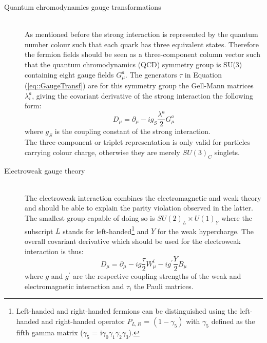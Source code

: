 \begin{myindentpar}
  \begin{description}
    \item[Quantum chromodynamics gauge transformations] \hfill \\
    As mentioned before the strong interaction is represented by the quantum number colour such that each quark has three equivalent states. Therefore the fermion fields should be seen as a three-component column vector such that the quantum chromodynamics (QCD) symmetry group is SU(3) containing eight gauge fields $G_{\mu}^{a}$. 
    The generators $\tau$ in Equation (\ref{eq::GaugeTransf}) are for this symmetry group the Gell-Mann matrices $\lambda_{i}^{a}$, giving the covariant derivative of the strong interaction the following form:
    \begin{equation}
      D_{\mu} = \partial_{\mu} - i g_{S} \frac{\lambda^{a}}{2} G_{\mu}^a
    \end{equation}
    where $g_{S}$ is the coupling constant of the strong interaction. \\
    The three-component or triplet representation is only valid for particles carrying colour charge, otherwise they are merely $SU(3)_{C}$ singlets. 
    
    \item[Electroweak gauge theory] \hfill \\
    The electroweak interaction combines the electromagnetic and weak theory and should be able to explain the parity violation observed in the latter. The smallest group capable of doing so is $SU(2)_{L} \times U(1)_{Y}$ where the subscript $L$ stands for left-handed\footnote{
      Left-handed and right-handed fermions can be distinguished using the left-handed and right-handed operator $P_{L,R}$ = $(1 - \gamma_{5})$ with $\gamma_5$ defined as the fifth gamma matrix ($\gamma_5$ = i$\gamma_0 \gamma_1 \gamma_2 \gamma_3$). 
    }
    and $Y$ for the weak hypercharge.
    The overall covariant derivative which should be used for the electroweak interaction is thus:
    \begin{equation}
     D_{\mu} = \partial_{\mu} - i g \frac{\tau}{2} W_{\mu}^{i} - i g^{'} \frac{Y}{2} B_{\mu}
    \end{equation}
    where $g$ and $g^{'}$ are the respective coupling strengths of the weak and electromagnetic interaction and $\tau_{i}$ the Pauli matrices. 
    

\end{description}
\end{myindentpar}
